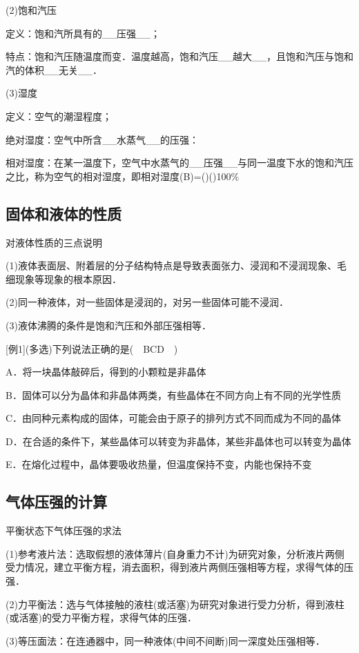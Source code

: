 (2)饱和汽压

定义：饱和汽所具有的\_\_压强\_\_；

特点：饱和汽压随温度而变．温度越高，饱和汽压\_\_越大\_\_，且饱和汽压与饱和汽的体积\_\_无关\_\_．

(3)湿度

定义：空气的潮湿程度；

绝对湿度：空气中所含\_\_水蒸气\_\_的压强：

相对湿度：在某一温度下，空气中水蒸气的\_\_压强\_\_与同一温度下水的饱和汽压之比，称为空气的相对湿度，即相对湿度(B)=()()100\%
\subsection{固体和液体的性质}

对液体性质的三点说明

(1)液体表面层、附着层的分子结构特点是导致表面张力、浸润和不浸润现象、毛细现象等现象的根本原因．

(2)同一种液体，对一些固体是浸润的，对另一些固体可能不浸润．

(3)液体沸腾的条件是饱和汽压和外部压强相等．

{[}例1{]}(多选)下列说法正确的是(　BCD　)

A．将一块晶体敲碎后，得到的小颗粒是非晶体

B．固体可以分为晶体和非晶体两类，有些晶体在不同方向上有不同的光学性质

C．由同种元素构成的固体，可能会由于原子的排列方式不同而成为不同的晶体

D．在合适的条件下，某些晶体可以转变为非晶体，某些非晶体也可以转变为晶体

E．在熔化过程中，晶体要吸收热量，但温度保持不变，内能也保持不变

\subsection{气体压强的计算}

平衡状态下气体压强的求法

(1)参考液片法：选取假想的液体薄片(自身重力不计)为研究对象，分析液片两侧受力情况，建立平衡方程，消去面积，得到液片两侧压强相等方程，求得气体的压强．

(2)力平衡法：选与气体接触的液柱(或活塞)为研究对象进行受力分析，得到液柱(或活塞)的受力平衡方程，求得气体的压强．

(3)等压面法：在连通器中，同一种液体(中间不间断)同一深度处压强相等．

